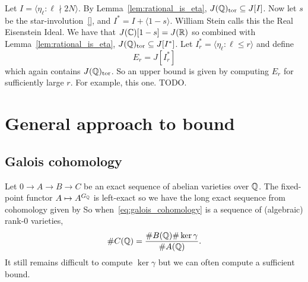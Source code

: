 \documentclass[11pt, proquest]{uwthesis}
\begin{document}
Let $I= \langle \eta_\ell:\ell\nmid 2N \rangle$. By
Lemma~\ref{lem:rational_is_eta}, $J(\mathbb{Q})_{\mathrm{tor}}\subseteq J[I]$. Now let $s$ be
the star-involution~\ref{}, and $I^*=I + \langle 1-s \rangle$. William Stein
calls this the Real Eisenstein Ideal. We have that $J(\mathbb{C})[1-s]=J(\mathbb{R})$ so
combined with Lemma~\ref{lem:rational_is_eta}, $J(\mathbb{Q})_{\mathrm{tor}}\subseteq 
J[I^*]$. Let $I_r ^* = \langle \eta_\ell:\ell\leq r \rangle$ and define
\begin{equation}%
    \label{eq:stein_eta_group}
    E_r = J[I_r ^*]
\end{equation}
which again contains $J(\mathbb{Q})_{\mathrm{tor}}$. So an upper bound is given by computing
$E_r$ for sufficiently large $r$. For example, this one. TODO.

\section{General approach to bound}%
\label{sec:galois_cohomology_bounds}

\subsection{Galois cohomology}%
\label{sub:galois_cohomology}

Let $0\to A\to B \to C$ be an exact sequence of abelian varieties over $\mathbb{Q}$.
The fixed-point functor $A\mapsto A^{G_{\mathbb{Q}}}$ is left-exact so we have the long
exact sequence from cohomology given by
So when~\eqref{eq:galois_cohomology} is a sequence of (algebraic) rank-0
varieties,
\begin{equation}%
    \label{eq:galois_cohomology_order}
    \# C(\QQ) =
    \frac{\# B(\QQ) \# \ker\gamma}{\# A(\QQ)}.
\end{equation}
It still remains difficult to compute $\ker\gamma$ but we can often compute a
sufficient bound.
\end{document}
